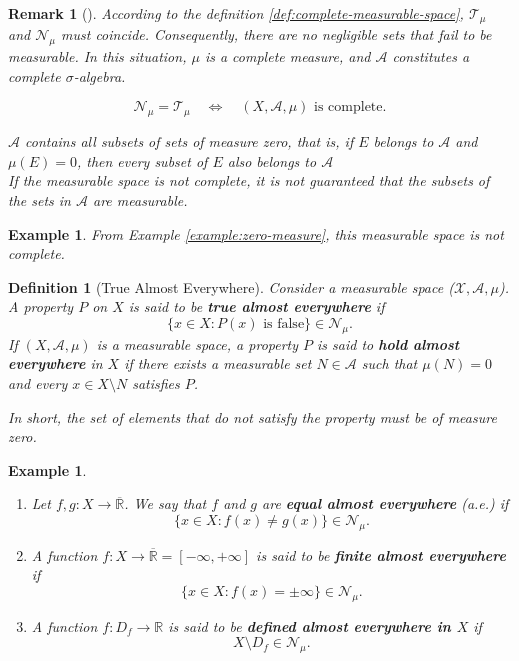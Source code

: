 \documentclass[10pt, oneside]{article}
\newenvironment{definitionbox}[1][]{\begin{defbox}\begin{defn}[#1]}{\end{defn}\end{defbox}}
\newenvironment{remarkbox}[1][]{\begin{rembox}\begin{rem}[#1]}{\end{rem}\end{rembox}}
\numberwithin{equation}{section}
\newtheorem{defn}{Definition}[section]
\newtheorem{rem}{Remark}
\newtheorem{example}[thm]{Example}
\begin{document}
\begin{remarkbox}

According to the definition \ref{def:complete-measurable-space}, $\mathcal{T}_\mu$ and $\mathcal{N}_\mu$ must coincide. 
Consequently, there are no negligible sets that fail to be measurable. 
In this situation, $\mu$ is a complete measure, and $\mathcal{A }$ constitutes a complete $\sigma$-algebra.

\[
\mathcal{N}_{\mu} = \mathcal{T}_{\mu}
\quad \Longleftrightarrow \quad
(X, \mathcal{A}, \mu) \text{ is complete.}
\]

$\mathcal{A}$ contains all subsets of sets of measure zero, that is, if $E$ belongs to $\mathcal{A}$ and $\mu(E)=0$, then every subset of $E$ also 
belongs to $\mathcal{A}$ \\
If the measurable space is not complete, it is not guaranteed that the subsets of the sets in $\mathcal{A}$ are measurable.

\end{remarkbox}

\begin{example}
    From Example \ref{example:zero-measure}, this measurable space is not complete.
\end{example}

\begin{definitionbox}[True Almost Everywhere]
Consider a measurable space ($\mathcal{X},\mathcal{A},\mu$). A property \(P\) on \(X\) is said to be \textbf{true almost everywhere} if
\[
\{x \in X : P(x) \text{ is false}\} \in \mathcal{N}_{\mu}.
\]
If \((X, \mathcal{A}, \mu)\) is a measurable space, a property \(P\) is said to \textbf{hold almost everywhere} in \(X\)  
if there exists a measurable set \(N \in \mathcal{A}\) such that \(\mu(N) = 0\) and every \(x \in X \setminus N\) satisfies \(P\).  

\textit{In short, the set of elements that do not satisfy the property must be of measure zero.}



\end{definitionbox}
\begin{example}
\begin{enumerate}[label=(\roman*)]
    \item Let \( f, g : X \to \overline{\mathbb{R}} \).  
    We say that \( f \) and \( g \) are \textbf{equal almost everywhere} (a.e.) if
    \[
    \{x \in X : f(x) \ne g(x)\} \in \mathcal{N}_{\mu}.
    \]

    \item A function \( f : X \to \overline{\mathbb{R}} = [-\infty, +\infty] \) is said to be \textbf{finite almost everywhere} if
    \[
    \{x \in X : f(x) = \pm \infty\} \in \mathcal{N}_{\mu}.
    \]

    \item A function \( f : D_f \to \mathbb{R} \) is said to be \textbf{defined almost everywhere in \( X \)} if
    \[
    X \setminus D_f \in \mathcal{N}_{\mu}.
    \]
\end{enumerate}
\end{example}
\end{document}
